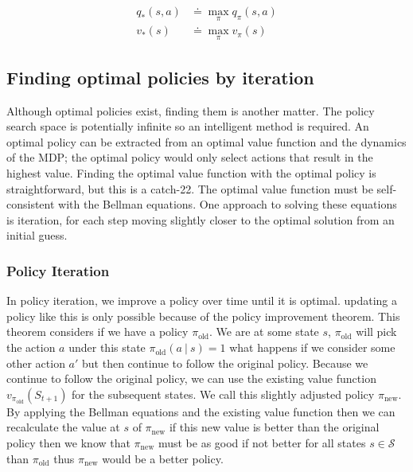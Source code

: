 \documentclass[]{final_report}
\begin{document}
\begin{align}
  q_\ast(s,a) & \doteq \max_\pi q_\pi(s,a)\label{eqn:q-optimal-def} \\
  v_\ast(s)   & \doteq \max_\pi v_\pi(s) \label{eqn:v-optimal-def}
\end{align}




\subsection{Finding optimal policies by iteration}\label{iteration-approaches}

Although optimal policies exist, finding them is another matter. The policy search space is potentially infinite so an intelligent method is required. An optimal policy can be extracted from an optimal value function and the dynamics of the MDP; the optimal policy would only select actions that result in the highest value. Finding the optimal value function with the optimal policy is straightforward, but this is a catch-22. The optimal value function must be self-consistent with the Bellman equations. One approach to solving these equations is iteration, for each step moving slightly closer to the optimal solution from an initial guess. 

\subsubsection{Policy Iteration}

In policy iteration, we improve a policy over time until it is optimal. updating a policy like this is only possible because of the policy improvement theorem. This theorem considers if we have a policy $\pi_{\text{old}}$. We are at some state $s$, $\pi_{\text{old}}$ will pick the action $a$ under this state $\pi_{\text{old}}(a\ |\ s) = 1$ what happens if we consider some other action $a'$ but then continue to follow the original policy. Because we continue to follow the original policy, we can use the existing value function $v_{\pi_{\text{old}}}(S_{t+1})$ for the subsequent states. We call this slightly adjusted policy $\pi_{\text{new}}$. By applying the Bellman equations and the existing value function then we can recalculate the value at $s$ of $\pi_{\text{new}}$ if this new value is better than the original policy then we know that $\pi_{\text{new}}$ must be as good if not better for all states $s \in \mathcal{S}$ than $\pi_{\text{old}}$ thus $\pi_{\text{new}}$ would be a better policy. 
\end{document}
